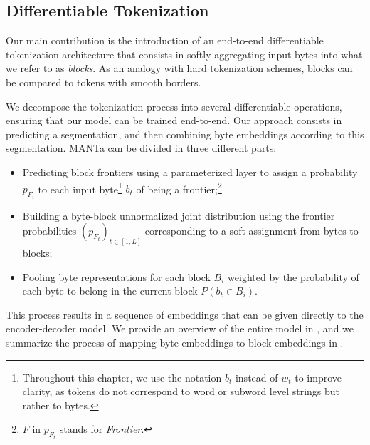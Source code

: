 
\subsection{Differentiable Tokenization}
\label{sec:differentiable_tokenization}
Our main contribution is the introduction of an end-to-end differentiable tokenization architecture that consists in softly aggregating input bytes into what we refer to as \textit{blocks}. As an analogy with hard tokenization schemes, blocks can be compared to tokens with smooth borders.

We decompose the tokenization process into several differentiable operations, ensuring that our model can be trained end-to-end. Our approach consists in predicting a segmentation, and then combining byte embeddings according to this segmentation. MANTa can be divided in three different parts:
\begin{itemize}
    \item Predicting block frontiers using a parameterized layer to assign a probability $p_{F_i}$ to each input byte\footnote{Throughout this chapter, we use the notation $b_t$ instead of $w_t$ to improve clarity, as tokens do not correspond to word or subword level strings but rather to bytes.} $b_t$ of being a frontier;\footnote{$F$ in $p_{F_t}$ stands for \textit{Frontier}.}
    \item Building a byte-block unnormalized joint distribution using the frontier probabilities $(p_{F_t})_{t \in [1, L]}$ corresponding to a soft assignment from bytes to blocks;
    \item Pooling byte representations for each block $B_i$ weighted by the probability of each byte to belong in the current block $P(b_t \in B_i)$.
\end{itemize}

This process results in a sequence of embeddings that can be given directly to the encoder-decoder model. We provide an overview of the entire model in , and we summarize the process of mapping byte embeddings to block embeddings in .

